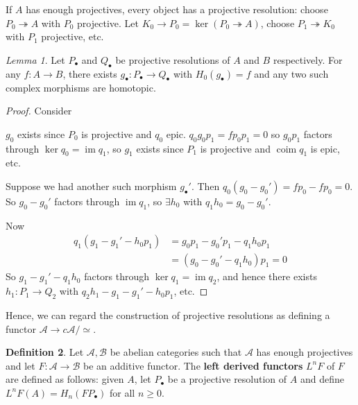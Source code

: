 \documentclass[a4paper]{article}
\theoremstyle{definition}
\newtheorem{definition}{Definition}
\theoremstyle{remark}
\theoremstyle{default}
\newtheorem{lemma}[definition]{Lemma}
\numberwithin{definition}{section}
\DeclareMathOperator{\img}{im}
\DeclareMathOperator{\coim}{coim}
\begin{document}
If $A$ has enough projectives,
every object has a projective resolution:
choose $P_0 \twoheadrightarrow A$ with $P_0$ projective.
Let $K_0 \to P_0 = \ker(P_0 \twoheadrightarrow A)$,
choose $P_1 \twoheadrightarrow K_0$ with $P_1$ projective, etc.

\begin{lemma}
	Let $P_\bullet$ and $Q_\bullet$ be projective resolutions of $A$ and $B$ respectively.
	For any $f: A \to B$,
	there exists $g_\bullet: P_\bullet \to Q_\bullet$ with $H_0(g_\bullet) = f$
	and any two such complex morphisms are homotopic.
	\label{722}
\end{lemma}
\begin{proof}
	Consider
	\begin{center}
	\end{center}
	$g_0$ exists since $P_0$ is projective and $q_0$ epic.
	$q_0g_0p_1 = fp_0p_1=0$ so $g_0p_1$ factors through $\ker q_0 = \img q_1$,
	so $g_1$ exists since $P_1$ is projective and $\coim q_1$ is epic, etc.
	
	Suppose we had another such morphism $g_\bullet'$.
	Then $q_0(g_0-g_0') = fp_0-fp_0 = 0$.
	So $g_0-g_0'$ factors through $\img q_1$,
	so $\exists h_0$ with $q_1h_0 = g_0-g_0'$.
	
	Now
	\begin{align*}
		q_1(g_1-g_1'- h_0p_1) &= g_0p_1-g_0'p_1-q_1h_0p_1 \\
		&= (g_0-g_0'-q_1h_0)p_1 = 0
	\end{align*}
	So $g_1-g_1'-q_1h_0$ factors through $\ker q_1 = \img q_2$,
	and hence there exists $h_1: P_1 \to Q_2$ with $q_2h_1-g_1-g_1'-h_0p_1$, etc.
\end{proof}

Hence, we can regard the construction of projective resolutions as defining a functor $\mathcal{A} \to c\mathcal{A}/\simeq$.

\begin{definition}
	Let $\mathcal{A}, \mathcal{B}$ be abelian categories such that $\mathcal{A}$ has enough projectives
	and let $F: \mathcal{A} \to \mathcal{B}$ be an additive functor.
	The \textbf{left derived functors} $L^nF$ of $F$ are defined as follows:
	given $A$, let $P_\bullet$ be a projective resolution of $A$ and define
	$L^nF(A) = H_n(FP_\bullet)$ for all $n \geq 0$.
	\label{723}
\end{definition}
\end{document}
